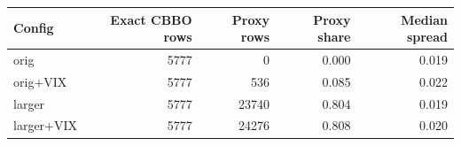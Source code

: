 \begin{tabular}{lrrrr}
\toprule
Config & Exact CBBO rows & Proxy rows & Proxy share & Median spread \\
\midrule
orig & 5777 & 0 & 0.000 & 0.019 \\
orig+VIX & 5777 & 536 & 0.085 & 0.022 \\
larger & 5777 & 23740 & 0.804 & 0.019 \\
larger+VIX & 5777 & 24276 & 0.808 & 0.020 \\
\bottomrule
\end{tabular}
